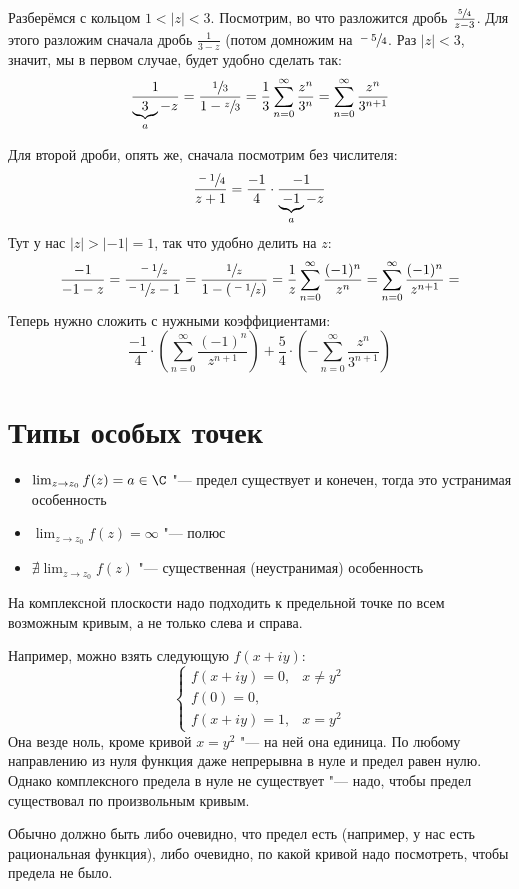 	Разберёмся с кольцом $1<|z|<3$.
	Посмотрим, во что разложится дробь $\frac{\sfrac 54}{z-3}$.
	Для этого разложим сначала дробь $\frac{1}{3-z}$ (потом домножим на $\sfrac{-5}{4}$.
	Раз $|z|<3$, значит, мы в первом случае, будет удобно сделать так:
	\[
		\frac{1}{\underbrace{3}_{a}-z} = \frac{\sfrac 13}{1-\sfrac z3} = \frac13 \sum_{n=0}^\infty \frac{z^n}{3^n} =
		\sum_{n=0}^\infty \frac{z^n}{3^{n+1}}
	\]

	Для второй дроби, опять же, сначала посмотрим без числителя:
	\begin{gather*}
		\frac{\sfrac{-1}{4}}{z+1} = \frac{-1}{4} \cdot \frac{-1}{\underbrace{-1}_{a}-z}
	\end{gather*}
	Тут у нас $|z|>|-1|=1$, так что удобно делить на $z$:
	\[
		\frac{-1}{-1-z} =
		\frac{\sfrac{-1}{z}}{\sfrac{-1}{z}-1} = 
		\frac{\sfrac{1}{z}}{1-(\sfrac{-1}{z})} =
		\frac1z \sum_{n=0}^\infty \frac{(-1)^n}{z^n} =
		\sum_{n=0}^\infty \frac{(-1)^n}{z^{n+1}} =
	\]
	Теперь нужно сложить с нужными коэффициентами:
	\[
		\frac{-1}{4} \cdot \left(\sum_{n=0}^\infty \frac{(-1)^n}{z^{n+1}}\right)
		+
		\frac{5}{4} \cdot \left(-\sum_{n=0}^\infty \frac{z^n}{3^{n+1}}\right)
	\]

\section{Типы особых точек}
	\begin{itemize}
		\item
			$\lim_{z\to z_0} f(z) = a \in \C$ "--- предел существует и конечен, тогда это устранимая особенность
		\item
			$\lim_{z\to z_0} f(z) = \infty$ "--- полюс
		\item
			$\nexists \lim_{z\to z_0} f(z)$ "--- существенная (неустранимая) особенность
	\end{itemize}

	\begin{Rem}
		На комплексной плоскости надо подходить к предельной точке по всем возможным кривым,
		а не только слева и справа.
	\end{Rem}
	\begin{exmp}
		Например, можно взять следующую $f(x+iy)$:
		\[
			\begin{cases}
				f(x+iy) = 0, & x \neq y^2 \\
				f(0) = 0, \\
				f(x+iy) = 1, & x = y^2
			\end{cases}
		\]
		Она везде ноль, кроме кривой $x=y^2$ "--- на ней она единица.
		По любому направлению из нуля функция даже непрерывна в нуле и предел равен нулю.
		Однако комплексного предела в нуле не существует "--- надо, чтобы предел существовал по произвольным кривым.
	\end{exmp}
	\begin{Rem}
		Обычно должно быть либо очевидно, что предел есть (например, у нас есть рациональная функция),
		либо очевидно, по какой кривой надо посмотреть, чтобы предела не было.
	\end{Rem}

